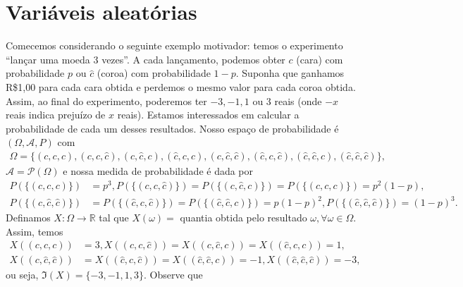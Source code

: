 \documentclass[../Notas.tex]{subfiles}
\begin{document}
\section{Variáveis aleatórias}
Comecemos considerando o seguinte exemplo motivador: temos o experimento ``lançar uma moeda 3 vezes''. A cada lançamento, podemos obter $c$ (cara) com probabilidade $p$ ou $\widehat{c}$ (coroa) com probabilidade $1-p$. Suponha que ganhamos R\$1,00 para cada cara obtida e perdemos o mesmo valor para cada coroa obtida.  Assim, ao final do experimento, poderemos ter $-3, -1, 1$ ou 3 reais (onde $-x$ reais indica prejuízo de $x$ reais). Estamos interessados em calcular a probabilidade de cada um desses resultados. Nosso espaço de probabilidade é $(\Omega, \mathcal{A}, P)$ com
\begin{align*}
    \Omega = \{ (c,c,c), (c,c,\widehat{c}), (c, \widehat{c}, c), (\widehat{c}, c, c), (c, \widehat{c}, \widehat{c}), (\widehat{c}, c, \widehat{c}), (\widehat{c}, \widehat{c}, c), (\widehat{c}, \widehat{c}, \widehat{c}) \},
\end{align*}
$\mathcal{A} = \mathcal{P}(\Omega)$ e nossa medida de probabilidade é dada por
\begin{align*}
    P(\{(c,c,c)\}) &= p^3, P(\{(c,c,\widehat{c})\}) = P(\{(c,\widehat{c},c)\}) = P(\{(\widehat{c},c,c)\}) = p^2(1-p), \\
    P(\{(c,\widehat{c},\widehat{c})\}) &= P(\{(\widehat{c},c,\widehat{c})\}) = P(\{(\widehat{c},\widehat{c},c)\}) = p(1-p)^2, P(\{(\widehat{c},\widehat{c},\widehat{c})\}) = (1-p)^3.
\end{align*}
Definamos $X:\Omega\to\mathbb{R}$ tal que $X(\omega) = $ quantia obtida pelo resultado $\omega, \forall\omega\in\Omega$. Assim, temos
\begin{align*}
    X((c,c,c)) &= 3, X((c,c,\widehat{c})) = X((c,\widehat{c},c)) = X((\widehat{c},c,c)) = 1, \\
    X((c,\widehat{c},\widehat{c})) &= X((\widehat{c},c,\widehat{c})) = X((\widehat{c},\widehat{c},c)) = -1, X((\widehat{c},\widehat{c},\widehat{c})) = -3,
\end{align*}
ou seja, $\Im(X) = \{-3,-1,1,3\}$. Observe que
\end{document}
